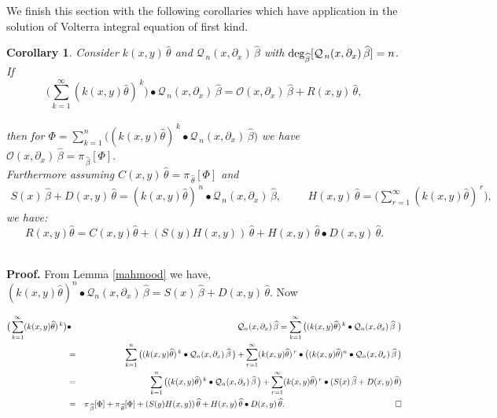 \documentclass[10pt]{article}
\newcommand{\be}{\begin{equation}}
\newcommand{\ee}{\end{equation}}
\newcommand{\bea}{\begin{eqnarray}}
\newcommand{\eea}{\end{eqnarray}}
\newcommand{\nn}{\nonumber}
\newcommand{\rd}{\partial}
\newcommand{\Deg}{\rm deg_{\widehat{\beta}}}
\newtheorem{cor}{Corollary}
\begin{document}
{{We finish this section with the following corollaries which have
application in the solution of Volterra integral equation of first
kind.

\begin{cor}\label{koloshani2}{Consider $k(x,y)\,\widehat{\theta}$ and ${\mathcal{Q}_{\,n}}(x,\rd_{x})\,\widehat{\beta}$ with
${\Deg}[{\mathcal{Q}_{\,n}}(x,\rd_{x})\,\widehat{\beta}]=n$. If \be
\Big(\sum_{k=1}^{\infty} (k(x,y)\widehat{\theta})^{\, k}\Big)\bullet
{\mathcal{Q}_{\,n}}(x,\rd_{x})\,\widehat{\beta}=\mathcal{O}(x,\rd_{x})\,\widehat{\beta}+
R(x,y)\,\widehat{\theta},\nn\ee\\
then for $\displaystyle\Phi=\sum_{k=1}^{n}
\big((k(x,y)\widehat{\theta})^{\, k} \bullet
{{\mathcal{Q}_{\,n}}}(x,\rd_{x})\,\widehat{\beta}\big)$ we have $
\mathcal{O}(x,\rd_{x}) \,\widehat{\beta} =
{\pi}_{\,\widehat{\beta}}[\Phi].$\\
Furthermore assuming $\displaystyle
C(x,y)\,\widehat{\theta}={\pi}_{\,\widehat{\theta}}[\Phi]$ and \bea
S(x)\,\widehat{\beta}+D(x,y)\,\widehat{\theta}=(k(x,y)\widehat{\theta})^{\,
n}\bullet
{\mathcal{Q}_{\,n}}(x,\rd_{x})\,\widehat{\beta},\hspace{1cm}
H(x,y)\,\widehat{\theta}=\big(\sum_{r=1}^{\infty}
(k(x,y)\widehat{\theta})^{\, r}\big), \nn\eea we have: \be
R(x,y)\widehat{\theta} =
C(x,y)\widehat{\theta}+(S(y)H(x,y))\,\widehat{\theta}+H(x,y)\,\widehat{\theta}\bullet
D(x,y)\,\widehat{\theta}.\nn\ee\\}
\end{cor}
{\bf Proof.} From Lemma \ref{mahmood} we have,
$(k(x,y)\widehat{\theta})^{n}\bullet
{\mathcal{Q}_{n}}(x,\rd_{x})\,\widehat{\beta}=
S(x)\,\widehat{\beta}+D(x,y)\,\widehat{\theta}$. Now

\bea
 \big(\sum_{k=1}^{\infty} (k(x,y)\widehat{\theta})^{\,
k}\big )&\bullet
&{\mathcal{Q}_{n}}(x,\rd_{x})\,\widehat{\beta}=\sum_{k=1}^{\infty}
\big((k(x,y)\widehat{\theta})^{\, k}
 \bullet {{\mathcal{Q}_{n}}}(x,\rd_{x})\,\widehat{\beta}\,\,\big)\nn\\&=& \sum_{k=1}^{n}
\big((k(x,y)\widehat{\theta})^{\, k} \bullet
{{\mathcal{Q}_{n}}}(x,\rd_{x})\,\widehat{\beta}\,\big)+
\sum_{r=1}^{\infty} (k(x,y)\widehat{\theta})^{\, r}
 \bullet \big((k(x,y)\widehat{\theta})^{n}\bullet
{\mathcal{Q}_{n}}(x,\rd_{x})\,\widehat{\beta}\,\big) \nn\\&=&
\sum_{k=1}^{n} \big((k(x,y)\widehat{\theta})^{\, k} \bullet
{{\mathcal{Q}_{n}}}(x,\rd_{x})\,\widehat{\beta}\,\big)+
\sum_{r=1}^{\infty} (k(x,y)\widehat{\theta})^{\, r}
 \bullet (S(x)\,\widehat{\beta}+D(x,y)\,\widehat{\theta})\nn\\&=&
{\pi}_{\,\widehat{\beta}}[\Phi]+{\pi}_{\,\widehat{\theta}}[\Phi]+(S(y)H(x,y))\,\widehat{\theta}+H(x,y)\,\widehat{\theta}\bullet
D(x,y)\,\widehat{\theta}. \nn \hspace{4cm}\qed\eea

}}
\end{document}
